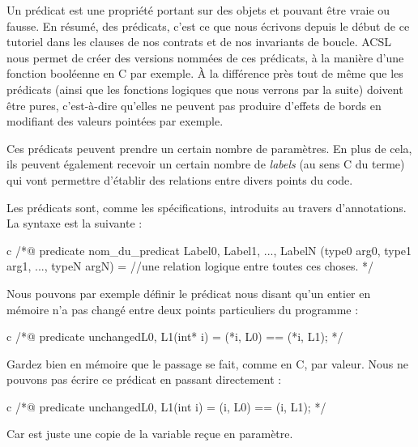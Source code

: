 Un prédicat est une propriété portant sur des objets et pouvant être vraie ou 
fausse. En résumé, des prédicats, c'est ce que nous écrivons depuis le début de
ce tutoriel dans les clauses de nos contrats et de nos invariants de boucle. 
ACSL nous permet de créer des versions nommées de ces prédicats, à la manière 
d'une fonction booléenne en C par exemple. À la différence près tout de même que
les prédicats (ainsi que les fonctions logiques que nous verrons par la suite) 
doivent être pures, c'est-à-dire qu'elles ne peuvent pas produire d'effets de 
bords en modifiant des valeurs pointées par exemple.



Ces prédicats peuvent prendre un certain nombre de paramètres. En plus de cela,
ils peuvent également recevoir un certain nombre de \textit{labels} (au sens C du terme) 
qui vont permettre d'établir des relations entre divers points du code.





Les prédicats sont, comme les spécifications, introduits au travers 
d'annotations. La syntaxe est la suivante :



\begin{CodeBlock}{c}
/*@
  predicate nom_du_predicat { Label0, Label1, ..., LabelN }(type0 arg0, type1 arg1, ..., typeN argN) =
    //une relation logique entre toutes ces choses.
*/
\end{CodeBlock}



Nous pouvons par exemple définir le prédicat nous disant qu'un entier en mémoire n'a
pas changé entre deux points particuliers du programme :



\begin{CodeBlock}{c}
/*@
  predicate unchanged{L0, L1}(int* i) =
    \at(*i, L0) == \at(*i, L1);
*/
\end{CodeBlock}



\begin{Warning}
Gardez bien en mémoire que le passage se fait, comme en C, par valeur. Nous ne
pouvons pas écrire ce prédicat en passant directement  :

\begin{CodeBlock}{c}
/*@
  predicate unchanged{L0, L1}(int i) =
    \at(i, L0) == \at(i, L1);
 */
\end{CodeBlock}

Car  est juste une copie de la variable reçue en paramètre.
\end{Warning}


